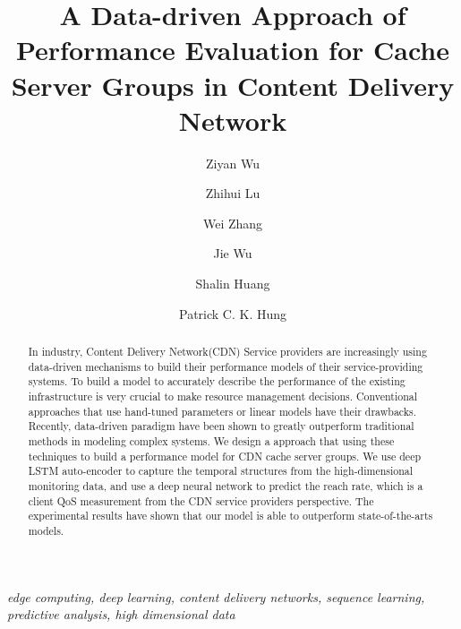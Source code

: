 \documentclass[5p]{elsarticle}
\newcommand{\dabiaolv}{reach rate}
\begin{document}
\begin{frontmatter}

\title{A Data-driven Approach of Performance Evaluation for Cache Server Groups in Content Delivery Network
    }

\author[mymainaddress]{Ziyan Wu
    }

\author[mymainaddress]{Zhihui Lu}

\author[mymainaddress]{Wei Zhang
    }
\author[mymainaddress]{Jie Wu
    }
\author[hismainaddress]{Shalin Huang}
\author[hisaddress]{Patrick C. K. Hung}


\address[mymainaddress]{School of Computer Science, Fudan University, Shanghai 200433, China}
\address[hismainaddress]{Wangsu Science & Technology Co., Ltd., Shanghai}
\address[hisaddress]{Faculty of Business and IT，University of Ontario Institute of Technology, Canada}


\begin{abstract}
In industry, Content Delivery Network(CDN) Service providers are increasingly using data-driven mechanisms to build their performance models of their service-providing systems. To build a model to accurately describe the performance of the existing infrastructure is very crucial to make resource management decisions. Conventional approaches that use hand-tuned parameters or linear models have their drawbacks. Recently, data-driven paradigm have been shown to greatly outperform traditional methods in modeling complex systems. We design a approach that using these techniques to build a performance model for CDN cache server groups. We use deep LSTM auto-encoder to capture the temporal structures from the high-dimensional monitoring data, and use a deep neural network to predict the \dabiaolv, which is a client QoS measurement from the CDN service providers perspective. The experimental results have shown that our model is able to outperform state-of-the-arts models.
\end{abstract}
\begin{keyword}
\textit{edge computing, deep learning, content delivery networks, sequence learning, predictive analysis, high dimensional data}
\end{keyword}
\end{frontmatter}
\linenumbers
\end{document}
